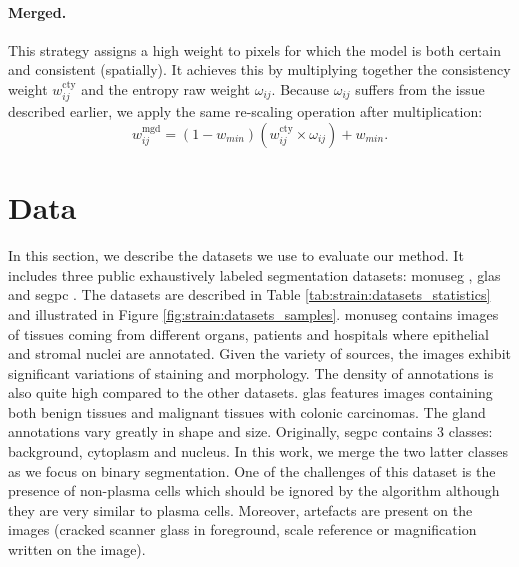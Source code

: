 \paragraph{Merged.} This strategy assigns a high weight to pixels for which the model is both certain and consistent (spatially). It achieves this by multiplying together the consistency weight $w^{\text{cty}}_{ij}$ and the entropy raw weight $\omega_{ij}$. Because $\omega_{ij}$ suffers from the issue described earlier, we apply the same re-scaling operation after multiplication:
\begin{equation}
w^{\text{mgd}}_{ij} = (1 - w_{min}) \left(w^{\text{cty}}_{ij} \times \omega_{ij}\right) + w_{min}.
\end{equation}

\section{Data}
\label{sec:strain:data}

In this section, we describe the datasets we use to evaluate our method. It includes three public exhaustively labeled segmentation datasets: \acrshort{monuseg} \parencite{kumar2019multi}, \acrshort{glas} \parencite{sirinukunwattana2017gland} and \acrshort{segpc} \parencite{gupta2021segpc}. The datasets are described in Table \ref{tab:strain:datasets_statistics} and illustrated in Figure \ref{fig:strain:datasets_samples}. \acrshort{monuseg} contains images of tissues coming from different organs, patients and hospitals where epithelial and stromal nuclei are annotated. Given the variety of sources, the images exhibit significant variations of staining and morphology. The density of annotations is also quite high compared to the other datasets. \acrshort{glas} features images containing both benign tissues and malignant tissues with colonic carcinomas. The gland annotations vary greatly in shape and size. Originally, \acrshort{segpc} contains 3 classes: background, cytoplasm and nucleus. In this work, we merge the two latter classes as we focus on binary segmentation. One of the challenges of this dataset is the presence of non-plasma cells which should be ignored by the algorithm although they are very similar to plasma cells. Moreover, artefacts are present on the images (\eg cracked scanner glass in foreground, scale reference or magnification written on the image).

